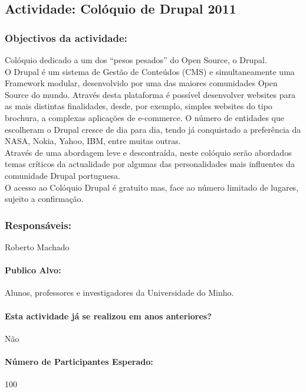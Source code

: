 \subsection{Actividade: Colóquio de Drupal 2011} 

\subsubsection*{Objectivos da actividade:}
\indent Colóquio dedicado a um dos “pesos pesados” do Open Source, o Drupal.\\
\indent O Drupal é um sistema de Gestão de Conteúdos (CMS) e simultaneamente uma Framework modular, desenvolvido por uma das maiores comunidades Open Source do mundo. Através desta plataforma é possível desenvolver websites para as mais distintas finalidades, desde, por exemplo, simples websites do tipo brochura, a complexas aplicações de e-commerce. O número de entidades que escolheram o Drupal cresce de dia para dia, tendo já conquistado a preferência da NASA, Nokia, Yahoo, IBM, entre muitas outras.\\
\indent Através de uma abordagem leve e descontraída, neste colóquio serão abordados temas críticos da actualidade por algumas das personalidades mais influentes da comunidade Drupal portuguesa.\\
\indent O acesso ao Colóquio Drupal é gratuito mas, face ao número limitado de lugares, sujeito a confirmação.
\subsubsection*{Responsáveis:}
\begin{itemizedash}
	\item{Roberto Machado}
\end{itemizedash}

\paragraph{Publico Alvo: }
Alunos, professores e investigadores da Universidade do Minho.

\paragraph{Esta actividade já se realizou em anos anteriores?}
Não

\paragraph{Número de Participantes Esperado:}
100

